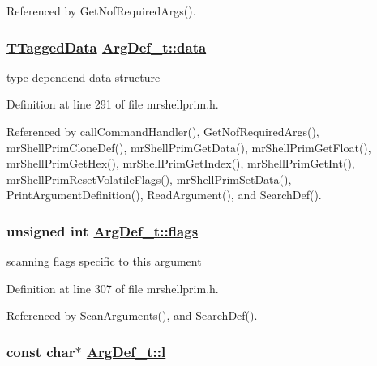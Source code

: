 Referenced by Get\-Nof\-Required\-Args().\hypertarget{structArgDef__t_75389251964258516f1e52fb06df857b}{
\subsubsection[data]{\setlength{\rightskip}{0pt plus 5cm}\hyperlink{structTaggedData__t}{TTagged\-Data} \hyperlink{structArgDef__t_75389251964258516f1e52fb06df857b}{Arg\-Def\_\-t::data}}}
\label{structArgDef__t_75389251964258516f1e52fb06df857b}


type dependend data structure 



Definition at line 291 of file mrshellprim.h.

Referenced by call\-Command\-Handler(), Get\-Nof\-Required\-Args(), mr\-Shell\-Prim\-Clone\-Def(), mr\-Shell\-Prim\-Get\-Data(), mr\-Shell\-Prim\-Get\-Float(), mr\-Shell\-Prim\-Get\-Hex(), mr\-Shell\-Prim\-Get\-Index(), mr\-Shell\-Prim\-Get\-Int(), mr\-Shell\-Prim\-Reset\-Volatile\-Flags(), mr\-Shell\-Prim\-Set\-Data(), Print\-Argument\-Definition(), Read\-Argument(), and Search\-Def().\hypertarget{structArgDef__t_5b37c4058072b47e0392590c26f7d0ca}{
\subsubsection[flags]{\setlength{\rightskip}{0pt plus 5cm}unsigned int \hyperlink{structArgDef__t_5b37c4058072b47e0392590c26f7d0ca}{Arg\-Def\_\-t::flags}}}
\label{structArgDef__t_5b37c4058072b47e0392590c26f7d0ca}


scanning flags specific to this argument 



Definition at line 307 of file mrshellprim.h.

Referenced by Scan\-Arguments(), and Search\-Def().\hypertarget{structArgDef__t_c076508155e43ccd57ed2f6c871a107d}{
\subsubsection[l]{\setlength{\rightskip}{0pt plus 5cm}const char$\ast$ \hyperlink{structArgDef__t_c076508155e43ccd57ed2f6c871a107d}{Arg\-Def\_\-t::l}}}
\label{structArgDef__t_c076508155e43ccd57ed2f6c871a107d}



